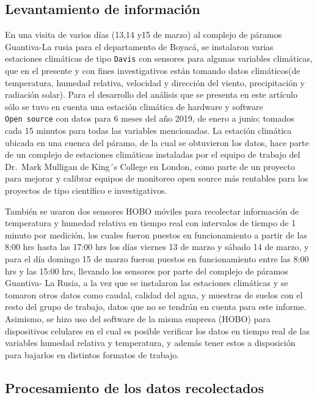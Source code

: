 \documentclass[conference,final,]{IEEEtran}
\begin{document}
\hypertarget{levantamiento-de-informaciuxf3n}{%
\subsection{Levantamiento de
información}\label{levantamiento-de-informaciuxf3n}}

En una visita de varios días (13,14 y15 de marzo) al complejo de páramos
Guantiva-La rusia para el departamento de Boyacá, se instalaron varias
estaciones climáticas de tipo \texttt{Davis} con sensores para algunas
variables climáticas, que en el presente y con fines investigativos
están tomando datos climáticos(de temperatura, humedad relativa,
velocidad y dirección del viento, precipitación y radiación solar). Para
el desarrollo del análisis que se presenta en este artículo sólo se tuvo
en cuenta una estación climática de hardware y software
\texttt{Open\ source} con datos para 6 meses del año 2019, de enero a
junio; tomados cada 15 minutos para todas las variables mencionadas. La
estación climática ubicada en una cuenca del páramo, de la cual se
obtuvieron los datos, hace parte de un complejo de estaciones climáticas
instaladas por el equipo de trabajo del Dr.~Mark Mulligan de King´s
College en London, como parte de un proyecto para mejorar y calibrar
equipos de monitoreo open source más rentables para los proyectos de
tipo científico e investigativos.

También se usaron dos sensores HOBO móviles para recolectar información
de temperatura y humedad relativa en tiempo real con intervalos de
tiempo de 1 minuto por medición, los cuales fueron puestos en
funcionamiento a partir de las 8:00 hrs hasta las 17:00 hrs los días
viernes 13 de marzo y sábado 14 de marzo, y para el día domingo 15 de
marzo fueron puestos en funcionamiento entre las 8:00 hrs y las 15:00
hrs, llevando los sensores por parte del complejo de páramos Guantiva-
La Rusia, a la vez que se instalaron las estaciones climáticas y se
tomaron otros datos como caudal, calidad del agua, y muestras de suelos
con el resto del grupo de trabajo, datos que no se tendrán en cuenta
para este informe. Asimismo, se hizo uso del software de la misma
empresa (HOBO) para dispositivos celulares en el cual es posible
verificar los datos en tiempo real de las variables humedad relativa y
temperatura, y además tener estos a disposición para bajarlos en
distintos formatos de trabajo.

\hypertarget{procesamiento-de-los-datos-recolectados}{%
\subsection{Procesamiento de los datos
recolectados}\label{procesamiento-de-los-datos-recolectados}}
\end{document}
